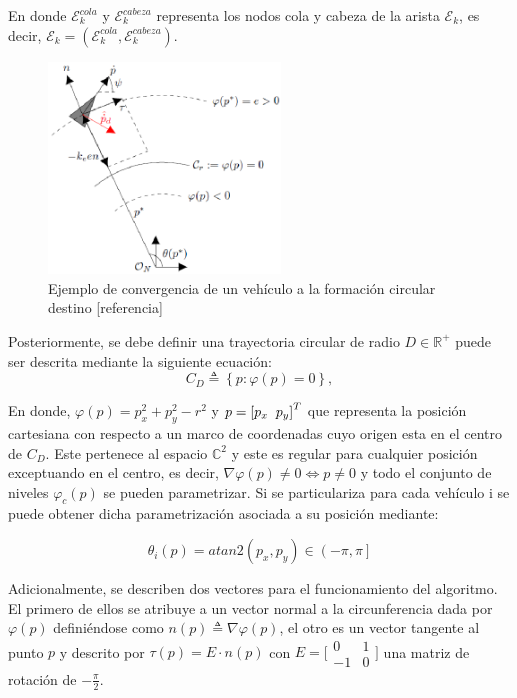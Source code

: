 En donde $\mathcal{E}^{cola}_{k}$ y $\mathcal{E}^{cabeza}_{k}$ representa los nodos cola y cabeza de la arista $\mathcal{E}_{k}$, es decir, $\mathcal{E}_{k}=\left(\mathcal{E}^{cola}_{k},\mathcal{E}^{cabeza}_{k}\right)$.

\begin{figure}[htb]
\centering
\includegraphics[width=0.55\textwidth]{figures/Control_1_2.eps}
\caption{Ejemplo de convergencia de un vehículo a la formación circular destino [referencia]} \label{Primera_Acción_Control}
\end{figure}

Posteriormente, se debe definir una trayectoria circular de radio $D\in\mathbb{R}^+$ puede ser descrita mediante la siguiente ecuación:
\begin{equation}
	C_D\triangleq\left\lbrace{p:\varphi{\left(p\right)}=0}\right\rbrace{,}
\end{equation}

En donde, $\varphi\left(p\right)=p_{x}^{2}+p_{y}^{2}-r^{2}$ y $p=\left[p_x\hspace{2mm}p_y\right]^T$ que representa la posición cartesiana con respecto a un marco de coordenadas cuyo origen esta en el centro de $C_D$. Este pertenece al espacio $\mathbb{C}^2$ y este es regular para cualquier posición exceptuando en el centro, es decir, $\nabla{\varphi\left(p\right)}\neq{0}\Longleftrightarrow{p}\neq{0}$ y todo el conjunto de niveles $\varphi_c\left(p\right)$ se pueden parametrizar. Si se particulariza para cada vehículo i se puede obtener dicha parametrización asociada a su posición mediante:

\begin{equation}
	\theta_{i}\left(p\right)=atan2\left(p_{x},p_{y}\right)\in\left(-\pi,\pi\right]
\end{equation} 

Adicionalmente, se describen dos vectores para el funcionamiento del algoritmo. El primero de ellos se atribuye a un vector normal a la circunferencia dada por $\varphi\left(p\right)$ definiéndose como $n\left(p\right)\triangleq\nabla\varphi\left(p\right)$, el otro es un vector tangente al punto $p$ y descrito por $\tau\left(p\right)=E\cdot{n\left(p\right)}$ con $E = \bigl[\begin{smallmatrix}0 & 1\\ -1 & 0\end{smallmatrix}\bigr]$ una matriz de rotación de $-\frac{\pi}{2}$.

